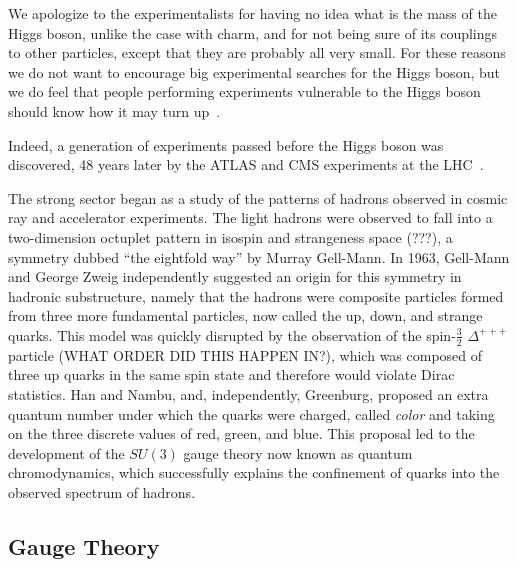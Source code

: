 \begin{displayquote}
	We apologize to the experimentalists for having no idea what is the mass of the Higgs boson, unlike the case with charm, and for not being sure of its couplings to other particles, except that they are probably all very small. For these reasons we do not want to encourage big experimental searches for the Higgs boson, but we do feel that people performing experiments vulnerable to the Higgs boson should know how it may turn up~\cite{gaillardnanoellis1975}.
\end{displayquote}


Indeed, a generation of experiments passed before the Higgs boson was discovered, 48 years later by the ATLAS and CMS experiments at the LHC~\cite{atlashiggs, cmshiggs}. 

The strong sector began as a study of the patterns of hadrons observed in cosmic ray and accelerator experiments. The light hadrons were observed to fall into a two-dimension octuplet pattern in isospin and strangeness space (???), a symmetry dubbed ``the eightfold way'' by Murray Gell-Mann. In 1963, Gell-Mann and George Zweig independently suggested an origin for this symmetry in hadronic substructure, namely that the hadrons were composite particles formed from three more fundamental particles, now called the up, down, and strange quarks. This model was quickly disrupted by the observation of the spin-$\frac32$ $\Delta^{+++}$ particle (WHAT ORDER DID THIS HAPPEN IN?), which was composed of three up quarks in the same spin state and therefore would violate Dirac statistics. Han and Nambu, and, independently, Greenburg, proposed an extra quantum number under which the quarks were charged, called \emph{color} and taking on the three discrete values of red, green, and blue. This proposal led to the development of the $SU(3)$ gauge theory now known as quantum chromodynamics, which successfully explains the confinement of quarks into the observed spectrum of hadrons. 


\subsection{Gauge Theory}


